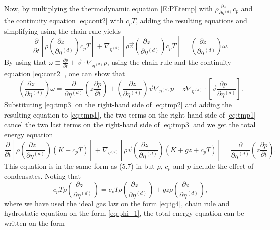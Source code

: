\documentclass{agujournal}
\begin{document}
{\begin{equation}
\end{equation}
Now, by multiplying the thermodynamic equation \eqref{E:PEtemp} with $\rho \frac{\partial z\quad }{\partial \eta^{(d)}}c_p$ and the continuity equation \eqref{eq:cont2} with $c_p T$, adding the resulting equations and simplifying using the chain rule yields
\begin{equation}
\frac{\partial }{\partial t}\left[ \rho \left( \frac{\partial z\quad }{\partial \eta^{(d)}}\right)c_p T\right]+\nabla_{\eta^{(d)}} \left[ \rho \vec{v} \left( \frac{\partial z\quad }{\partial \eta^{(d)}}\right)c_p T\right]=\left( \frac{\partial z\quad}{\partial \eta^{(d)}}\right)\omega.\label{eq:tmp2}
\end{equation}
By using that $\omega\equiv \frac{\partial p}{\partial t}+\vec{v} \cdot \nabla_{\eta^{(d)}} p$, using the chain rule and the continuity equation \eqref{eq:cont2} , one can show that
\begin{equation}
\left( \frac{\partial z\quad}{\partial \eta^{(d)}}\right)\omega = \frac{\partial}{\partial \eta^{(d)}}\left( z\frac{\partial p}{\partial t}\right)+\left( \frac{\partial z}{\partial \eta^{(d)}}\right)\vec{v} \nabla_{\eta^{(d)}}p +z \nabla_{\eta^{(d)}}\cdot \left[ \vec{v} \frac{\partial p\quad }{\partial \eta^{(d)}}\right].\label{eq:tmp3}
\end{equation}
Substituting \eqref{eq:tmp3} on the right-hand side of \eqref{eq:tmp2} and adding the resulting equation to \eqref{eq:tmp1}, the two terms on the right-hand side of \eqref{eq:tmp1} cancel the two last terms on the right-hand side of \eqref{eq:tmp3} and we get the total energy equation
\begin{equation}
\frac{\partial }{\partial t}\left[ \rho \left( \frac{\partial z\quad }{\partial \eta^{(d)}}\right)\left(K+c_pT\right)\right]+\nabla_{\eta^{(d)}} \left[ \rho \vec{v} \left( \frac{\partial z\quad }{\partial \eta^{(d)}}\right) \left( K+gz+c_pT \right) \right]=\frac{\partial}{\partial \eta^{(d)}}\left( z\frac{\partial p}{\partial t}\right).\label{eq:Etotp}
\end{equation}
This equation is in the same form as (5.7) in \cite{K1974MWR} but $\rho$, $c_p$ and $p$ include the effect of condensates. Noting that
\begin{equation}
c_pT\rho \left( \frac{\partial z\quad }{\partial \eta^{(d)}}\right)=c_vT\rho \left( \frac{\partial z\quad }{\partial \eta^{(d)}}\right)+g z \rho \left( \frac{\partial z\quad }{\partial \eta^{(d)}}\right),
\end{equation}
where we have used the ideal gas law on the form \eqref{eq:ig4}, chain rule and hydrostatic equation on the form \eqref{eq:phi_1}, the total energy equation can be written on the form
}
\end{document}
